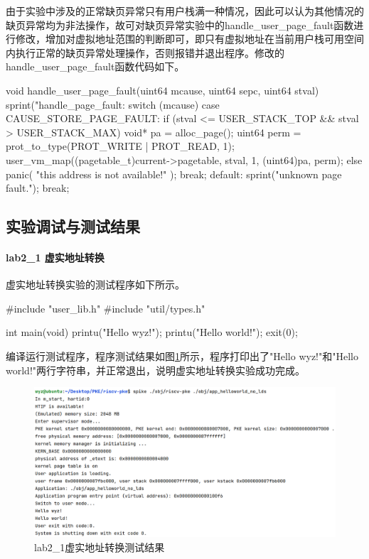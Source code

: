 由于实验中涉及的正常缺页异常只有用户栈满一种情况，因此可以认为其他情况的缺页异常均为非法操作，故可对缺页异常实验中的handle_user_page_fault函数进行修改，增加对虚拟地址范围的判断即可，即只有虚拟地址在当前用户栈可用空间内执行正常的缺页异常处理操作，否则报错并退出程序。修改的handle_user_page_fault函数代码如下。
\begin{cppcode}
void handle_user_page_fault(uint64 mcause, uint64 sepc, uint64 stval) {
    sprint("handle_page_fault: %
    switch (mcause) {
        case CAUSE_STORE_PAGE_FAULT:
            if (stval <= USER_STACK_TOP && stval > USER_STACK_MAX) {
                void* pa = alloc_page();
                uint64 perm = prot_to_type(PROT_WRITE | PROT_READ, 1);
                user_vm_map((pagetable_t)current->pagetable, stval, 1, (uint64)pa, perm);
            }
            else {
                panic( "this address is not available!" );
            }
            break;
        default:
            sprint("unknown page fault.\n");
            break;
    }
}
\end{cppcode}
\subsection{实验调试与测试结果}
\paragraph{lab2_1 虚实地址转换} 虚实地址转换实验的测试程序如下所示。
\begin{cppcode}
#include "user_lib.h"
#include "util/types.h"

int main(void) {
  printu("Hello wyz!\n");
  printu("Hello world!\n");
  exit(0);
}
\end{cppcode}

编译运行测试程序，程序测试结果如图\ref{fig:lab2-1-testres}所示，程序打印出了"Hello wyz!"和"Hello world!"两行字符串，并正常退出，说明虚实地址转换实验成功完成。
\begin{figure}[!htbp]
    \centering
    \includegraphics[width = 13cm]{figure/lab2_1_testresult.png}
    \caption{lab2_1虚实地址转换测试结果}
    \label{fig:lab2-1-testres}
\end{figure}

